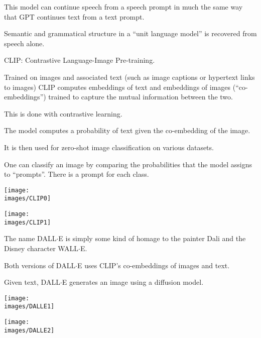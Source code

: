 {{\vfill
This model can continue speech from a speech prompt in much the same way that GPT continues text from a text prompt.

\vfill
Semantic and grammatical structure in a ``unit language model'' is recovered
from speech alone.



CLIP: {\color{red} Contrastive} Language-Image Pre-training.

\vfill
Trained on images and associated text (such as image captions or hypertext links to images) CLIP computes embeddings of text and embeddings of images
(``co-embeddings'') trained to capture the mutual information between the two.

\vfill
This is done with contrastive learning.


The model computes a probability of text given the co-embedding of the image.

\vfill
It is then used for zero-shot image classification on various datasets.

\vfill
One can classify an image by comparing the probabilities that the model assigns to ``prompts''.  There is a prompt for each class.


\centerline{\texttt{[image: \\images/CLIP0]}}


\centerline{\texttt{[image: \\images/CLIP1]}}


The name DALL$\cdot$E is simply some kind of homage to the painter Dali and the Disney character WALL$\cdot$E.

\vfill
Both versions of DALL$\cdot$E uses CLIP's co-embeddings of images and text.

\vfill
Given text, DALL$\cdot$E generates an image using a {\color{red} diffusion model}.


\centerline{\texttt{[image: \\images/DALLE1]}}


\centerline{\texttt{[image: \\images/DALLE2]}}


}}
